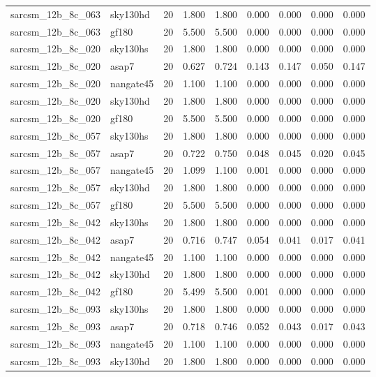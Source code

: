 \begin{tabular}{llrrrrrrr}
sarcsm\_12b\_8c\_063 & sky130hd & 20 & 1.800 & 1.800 & 0.000 & 0.000 & 0.000 & 0.000 \\
sarcsm\_12b\_8c\_063 & gf180 & 20 & 5.500 & 5.500 & 0.000 & 0.000 & 0.000 & 0.000 \\
sarcsm\_12b\_8c\_020 & sky130hs & 20 & 1.800 & 1.800 & 0.000 & 0.000 & 0.000 & 0.000 \\
sarcsm\_12b\_8c\_020 & asap7 & 20 & 0.627 & 0.724 & 0.143 & 0.147 & 0.050 & 0.147 \\
sarcsm\_12b\_8c\_020 & nangate45 & 20 & 1.100 & 1.100 & 0.000 & 0.000 & 0.000 & 0.000 \\
sarcsm\_12b\_8c\_020 & sky130hd & 20 & 1.800 & 1.800 & 0.000 & 0.000 & 0.000 & 0.000 \\
sarcsm\_12b\_8c\_020 & gf180 & 20 & 5.500 & 5.500 & 0.000 & 0.000 & 0.000 & 0.000 \\
sarcsm\_12b\_8c\_057 & sky130hs & 20 & 1.800 & 1.800 & 0.000 & 0.000 & 0.000 & 0.000 \\
sarcsm\_12b\_8c\_057 & asap7 & 20 & 0.722 & 0.750 & 0.048 & 0.045 & 0.020 & 0.045 \\
sarcsm\_12b\_8c\_057 & nangate45 & 20 & 1.099 & 1.100 & 0.001 & 0.000 & 0.000 & 0.000 \\
sarcsm\_12b\_8c\_057 & sky130hd & 20 & 1.800 & 1.800 & 0.000 & 0.000 & 0.000 & 0.000 \\
sarcsm\_12b\_8c\_057 & gf180 & 20 & 5.500 & 5.500 & 0.000 & 0.000 & 0.000 & 0.000 \\
sarcsm\_12b\_8c\_042 & sky130hs & 20 & 1.800 & 1.800 & 0.000 & 0.000 & 0.000 & 0.000 \\
sarcsm\_12b\_8c\_042 & asap7 & 20 & 0.716 & 0.747 & 0.054 & 0.041 & 0.017 & 0.041 \\
sarcsm\_12b\_8c\_042 & nangate45 & 20 & 1.100 & 1.100 & 0.000 & 0.000 & 0.000 & 0.000 \\
sarcsm\_12b\_8c\_042 & sky130hd & 20 & 1.800 & 1.800 & 0.000 & 0.000 & 0.000 & 0.000 \\
sarcsm\_12b\_8c\_042 & gf180 & 20 & 5.499 & 5.500 & 0.001 & 0.000 & 0.000 & 0.000 \\
sarcsm\_12b\_8c\_093 & sky130hs & 20 & 1.800 & 1.800 & 0.000 & 0.000 & 0.000 & 0.000 \\
sarcsm\_12b\_8c\_093 & asap7 & 20 & 0.718 & 0.746 & 0.052 & 0.043 & 0.017 & 0.043 \\
sarcsm\_12b\_8c\_093 & nangate45 & 20 & 1.100 & 1.100 & 0.000 & 0.000 & 0.000 & 0.000 \\
sarcsm\_12b\_8c\_093 & sky130hd & 20 & 1.800 & 1.800 & 0.000 & 0.000 & 0.000 & 0.000 \\

\end{tabular}
